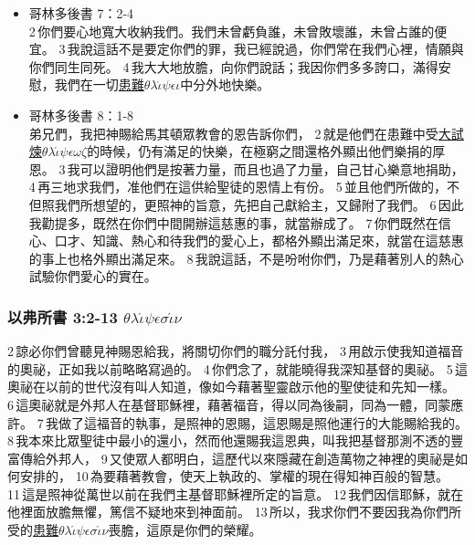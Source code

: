 \begin{itemize}
 \item{哥林多後書 7：2-4}   \\ 2 你們要心地寬大收納我們。我們未曾虧負誰，未曾敗壞誰，未曾占誰的便宜。 3 我說這話不是要定你們的罪，我已經說過，你們常在我們心裡，情願與你們同生同死。 4 我大大地放膽，向你們說話；我因你們多多誇口，滿得安慰，我們在一切\underline{患難$\theta$$\lambda$$\acute{\iota}$$\psi$$\epsilon$$\iota$}中分外地快樂。 
 \item{哥林多後書 8：1-8}   \\弟兄們，我把神賜給馬其頓眾教會的恩告訴你們， 2 就是他們在患難中受\underline{大試煉$\theta$$\lambda$$\acute{\iota}$$\psi$$\epsilon$$\omega$$\zeta$}的時候，仍有滿足的快樂，在極窮之間還格外顯出他們樂捐的厚恩。 3 我可以證明他們是按著力量，而且也過了力量，自己甘心樂意地捐助， 4 再三地求我們，准他們在這供給聖徒的恩情上有份。 5 並且他們所做的，不但照我們所想望的，更照神的旨意，先把自己獻給主，又歸附了我們。 6 因此我勸提多，既然在你們中間開辦這慈惠的事，就當辦成了。 7 你們既然在信心、口才、知識、熱心和待我們的愛心上，都格外顯出滿足來，就當在這慈惠的事上也格外顯出滿足來。 8 我說這話，不是吩咐你們，乃是藉著別人的熱心試驗你們愛心的實在。    
\end{itemize}
 
 
 
 \subsubsection{以弗所書 3:2-13 $\theta$$\lambda$$\acute{\iota}$$\psi$$\epsilon$$\sigma$$\acute{\iota}$$\nu$} 
 2 諒必你們曾聽見神賜恩給我，將關切你們的職分託付我， 3 用啟示使我知道福音的奧祕，正如我以前略略寫過的。 4 你們念了，就能曉得我深知基督的奧祕。 5 這奧祕在以前的世代沒有叫人知道，像如今藉著聖靈啟示他的聖使徒和先知一樣。 6 這奧祕就是外邦人在基督耶穌裡，藉著福音，得以同為後嗣，同為一體，同蒙應許。 7 我做了這福音的執事，是照神的恩賜，這恩賜是照他運行的大能賜給我的。 8 我本來比眾聖徒中最小的還小，然而他還賜我這恩典，叫我把基督那測不透的豐富傳給外邦人， 9 又使眾人都明白，這歷代以來隱藏在創造萬物之神裡的奧祕是如何安排的， 10 為要藉著教會，使天上執政的、掌權的現在得知神百般的智慧。 11 這是照神從萬世以前在我們主基督耶穌裡所定的旨意。 12 我們因信耶穌，就在他裡面放膽無懼，篤信不疑地來到神面前。 13 所以，我求你們不要因我為你們所受的\underline{患難$\theta$$\lambda$$\acute{\iota}$$\psi$$\epsilon$$\sigma$$\acute{\iota}$$\nu$}喪膽，這原是你們的榮耀。
 
 
